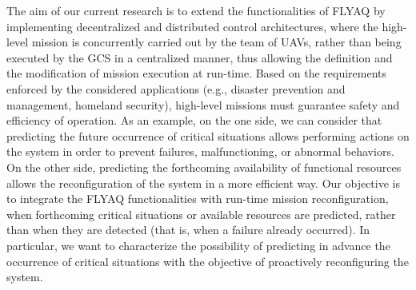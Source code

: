 \documentclass[letterpaper, 10 pt, conference]{ieeeconf}
\begin{document}
The aim of our current research is to extend the functionalities of FLYAQ by implementing  decentralized and distributed control architectures, 
where the high-level mission is concurrently carried out by the team of UAVs, rather than being executed by the GCS in a centralized manner, thus allowing the definition and the modification of mission execution at run-time.
%
%
%
Based on the requirements enforced by the considered applications (e.g., disaster prevention and management, homeland security), high-level missions must guarantee safety and efficiency of operation. 
As an example, on the one side, we can consider that predicting the future occurrence of critical situations allows performing actions on the system in order to prevent failures, malfunctioning, or abnormal behaviors. On the other side, predicting the forthcoming availability of functional resources allows the reconfiguration of the system in a more efficient way.
Our objective is to integrate the FLYAQ functionalities with run-time mission reconfiguration, when forthcoming critical situations or available resources are predicted, rather than when they are detected (that is, when a failure already occurred). In particular, we want to characterize the possibility of predicting in advance the occurrence of critical situations with the objective of proactively reconfiguring the system.
\end{document}
